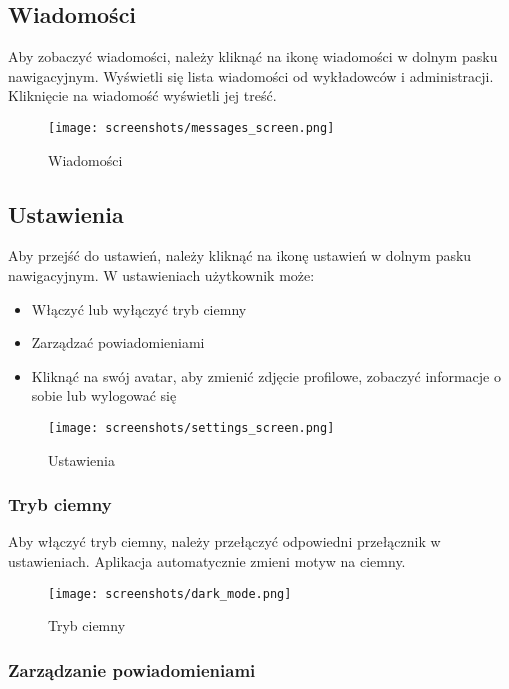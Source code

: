 \subsection{Wiadomości}

Aby zobaczyć wiadomości, należy kliknąć na ikonę wiadomości w dolnym pasku nawigacyjnym. Wyświetli się lista wiadomości od wykładowców i administracji. Kliknięcie na wiadomość wyświetli jej treść.

\begin{figure}[h!]
  \centering
  \texttt{[image: screenshots/messages\_screen.png]}
  \caption{Wiadomości}
  \label{fig:messages_screen}
\end{figure}

\subsection{Ustawienia}

Aby przejść do ustawień, należy kliknąć na ikonę ustawień w dolnym pasku nawigacyjnym. W ustawieniach użytkownik może:

\begin{itemize}
  \item Włączyć lub wyłączyć tryb ciemny
  \item Zarządzać powiadomieniami
  \item Kliknąć na swój avatar, aby zmienić zdjęcie profilowe, zobaczyć informacje o sobie lub wylogować się
\end{itemize}

\begin{figure}[h!]
  \centering
  \texttt{[image: screenshots/settings\_screen.png]}
  \caption{Ustawienia}
  \label{fig:settings_screen}
\end{figure}

\subsubsection{Tryb ciemny}

Aby włączyć tryb ciemny, należy przełączyć odpowiedni przełącznik w ustawieniach. Aplikacja automatycznie zmieni motyw na ciemny.

\begin{figure}[h!]
  \centering
  \texttt{[image: screenshots/dark\_mode.png]}
  \caption{Tryb ciemny}
  \label{fig:dark_mode}
\end{figure}

\subsubsection{Zarządzanie powiadomieniami}

